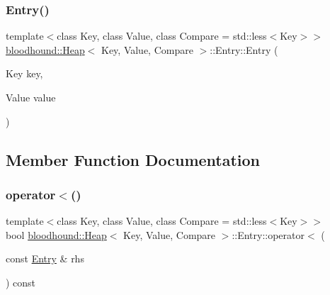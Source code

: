 \mbox{\label{structbloodhound_1_1Heap_1_1Entry_a66cc03955b70ebbadf7536f6ebf963f2}} 
\subsubsection{\texorpdfstring{Entry()}{Entry()}\hspace{0.1cm}{\footnotesize\ttfamily [2/2]}}
{\footnotesize\ttfamily template$<$class Key, class Value, class Compare = std\+::less$<$\+Key$>$$>$ \\
\hyperlink{classbloodhound_1_1Heap}{bloodhound\+::\+Heap}$<$ Key, Value, Compare $>$\+::Entry\+::\+Entry (\begin{DoxyParamCaption}\item[{Key}]{key,  }\item[{Value}]{value }\end{DoxyParamCaption})\hspace{0.3cm}{\ttfamily [inline]}}



\subsection{Member Function Documentation}
\mbox{\label{structbloodhound_1_1Heap_1_1Entry_a17049d7313c3c1cd51f9c684ddb50500}} 
\subsubsection{\texorpdfstring{operator$<$()}{operator<()}}
{\footnotesize\ttfamily template$<$class Key, class Value, class Compare = std\+::less$<$\+Key$>$$>$ \\
bool \hyperlink{classbloodhound_1_1Heap}{bloodhound\+::\+Heap}$<$ Key, Value, Compare $>$\+::Entry\+::operator$<$ (\begin{DoxyParamCaption}\item[{const \hyperlink{structbloodhound_1_1Heap_1_1Entry}{Entry} \&}]{rhs }\end{DoxyParamCaption}) const\hspace{0.3cm}{\ttfamily [inline]}}

